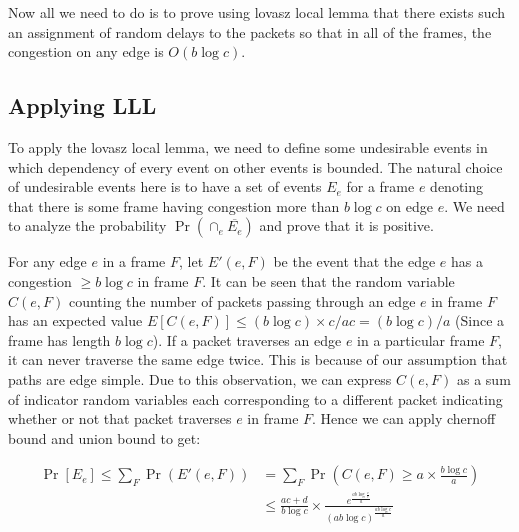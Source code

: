 Now all we need to do is to prove using lovasz local lemma that there exists such an assignment of random delays to the packets so that in all of the frames, the congestion on any edge is $O(b\log c) $.

\subsection{Applying LLL}
To apply the lovasz local lemma, we need to define some undesirable events in which dependency of every event on other events is bounded. The natural choice of undesirable events here is to have a set of events $E_e$ for a frame $e$ denoting that there is some frame having congestion more than $b\log c$ on edge $e$. We need to analyze the probability $\Pr(\cap_{e} \overline{E_e}) $ and prove that it is positive.

For any edge $e$ in a frame $F$, let $E'(e,F) $ be the event that the edge $e$ has a congestion $\geq b\log c $ in frame $F$. It can be seen that the random variable $C(e,F) $ counting the number of packets passing through an edge $e$ in frame $F$ has an expected value $E[C(e,F)]\leq (b\log c)\times c/ac = (b\log c)/a $ (Since a frame has length $b\log c$). If a packet traverses an edge $e$ in a particular frame $F$, it can never traverse the same edge twice. This is because of our assumption that paths are edge simple. Due to this observation, we can express $C(e,F) $ as a sum of indicator random variables each corresponding to a different packet indicating whether or not that packet traverses $e$ in frame $F$. Hence we can apply chernoff bound and union bound to get:

\begin{equation*}
\begin{align}
 \Pr[E_e] \leq \sum_F \Pr(E'(e,F)) &= \sum_F\Pr\left(C(e,F) \geq a\times \frac{b\log c}{a} \right)\\
 & \leq \frac{ac+d}{b\log c} \times \frac{e^{\frac{ab\log \frac{c}{e}}{a} } }{(ab\log c)^{\frac{ab\log c}{a} }} \\
\end{align}
\end{equation*}




